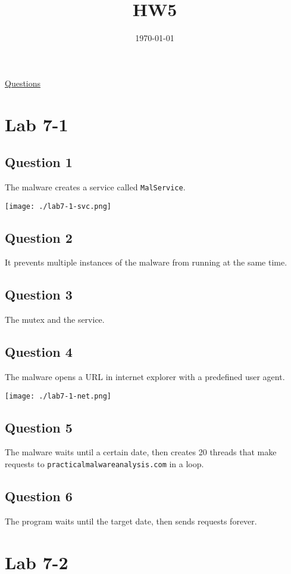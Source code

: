 \documentclass[11pt]{article}
\date{\today}
\title{HW5}
\begin{document}
\maketitle
\tableofcontents

\href{https://docs.google.com/document/d/1-ne6wM4j62DeNSo47u5rZV3XYM8Ev\_LplBILcEMCsNo/edit}{Questions}
\section{Lab 7-1}
\label{sec:orga90c2da}
\subsection{Question 1}
\label{sec:org6c81abf}
The malware creates a service called \texttt{MalService}.
\begin{center}
\texttt{[image: ./lab7-1-svc.png]}
\end{center}
\subsection{Question 2}
\label{sec:orgb31c276}
It prevents multiple instances of the malware from running at the same
time.
\subsection{Question 3}
\label{sec:org84b0371}
The mutex and the service.
\subsection{Question 4}
\label{sec:orgd1b2e60}
The malware opens a URL in internet explorer with a predefined user agent.
\begin{center}
\texttt{[image: ./lab7-1-net.png]}
\end{center}
\subsection{Question 5}
\label{sec:orgc1a5f0f}
The malware waits until a certain date, then creates 20 threads that
make requests to \texttt{practicalmalwareanalysis.com} in a loop.
\subsection{Question 6}
\label{sec:org884ce1e}
The program waits until the target date, then sends requests forever.
\section{Lab 7-2}
\label{sec:org09d48a9}
\end{document}
